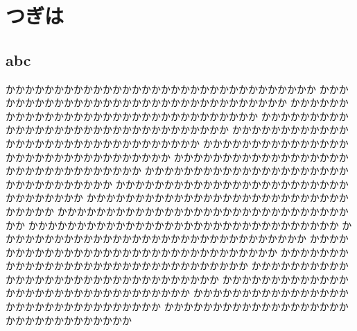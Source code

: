 \documentclass{jbook}
\begin{document}
\chapter{つぎは}
\section{abc}
かかかかかかかかかかかかかかかかかかかかかかかかかかかかかかかか
かかかかかかかかかかかかかかかかかかかかかかかかかかかかかかかか
かかかかかかかかかかかかかかかかかかかかかかかかかかかかかかかか
かかかかかかかかかかかかかかかかかかかかかかかかかかかかかかかか
かかかかかかかかかかかかかかかかかかかかかかかかかかかかかかかか
かかかかかかかかかかかかかかかかかかかかかかかかかかかかかかかか
かかかかかかかかかかかかかかかかかかかかかかかかかかかかかかかか
かかかかかかかかかかかかかかかかかかかかかかかかかかかかかかかか
かかかかかかかかかかかかかかかかかかかかかかかかかかかかかかかか
かかかかかかかかかかかかかかかかかかかかかかかかかかかかかかかか
かかかかかかかかかかかかかかかかかかかかかかかかかかかかかかかか
かかかかかかかかかかかかかかかかかかかかかかかかかかかかかかかか
かかかかかかかかかかかかかかかかかかかかかかかかかかかかかかかか
かかかかかかかかかかかかかかかかかかかかかかかかかかかかかかかか
かかかかかかかかかかかかかかかかかかかかかかかかかかかかかかかか
かかかかかかかかかかかかかかかかかかかかかかかかかかかかかかかか
かかかかかかかかかかかかかかかかかかかかかかかかかかかかかかかか
かかかかかかかかかかかかかかかかかかかかかかかかかかかかかかかか
かかかかかかかかかかかかかかかかかかかかかかかかかかかかかかかか
\end{document}
